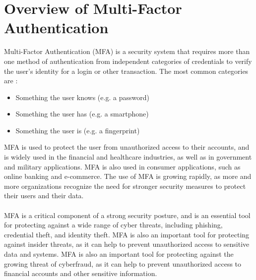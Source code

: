 \documentclass[12pt]{report}
\begin{document}
\section{Overview of Multi-Factor Authentication}

Multi-Factor Authentication (MFA) is a security system that requires more than
one method of authentication from independent categories of credentials to verify
the user's identity for a login or other transaction. The most common
categories are \cite{mfa}:
\begin{itemize}
	\item Something the user knows (e.g. a password)

	\item Something the user has (e.g. a smartphone)

	\item Something the user is (e.g. a fingerprint)
\end{itemize}
MFA is used to protect the user from unauthorized access to their accounts,
and is widely used in the financial and healthcare industries, as well as in government
and military applications. MFA is also used in consumer applications, such as online
banking and e-commerce. The use of MFA is growing rapidly, as more and more organizations
recognize the need for stronger security measures to protect their users and their
data. \\ \\ MFA is a critical component of a strong security posture, and is an
essential tool for protecting against a wide range of cyber threats, including
phishing, credential theft, and identity theft. MFA is also an important tool for
protecting against insider threats, as it can help to prevent unauthorized
access to sensitive data and systems. MFA is also an important tool for protecting
against the growing threat of cyberfraud, as it can help to prevent
unauthorized access to financial accounts and other sensitive information. \\ \\
\end{document}
